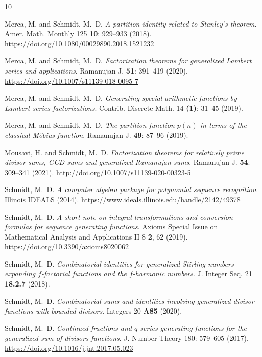 \documentclass[10pt,reqno,letterpaper]{article}
\theoremstyle{plain}
\numberwithin{theorem}{section}
\theoremstyle{definition}
\newcounter{completeBibitemIncrementCtr}
\renewenvironment{thebibliography}[1]{
     \renewcommand{\refname}{} 
     
     \begin{oldthebibliography}{#1}
     \setlength{\itemsep}{0em}
     \setlength{\parskip}{0em}
     \setlength{\topsep}{0pt}
     \setlength{\partopsep}{0pt}
     \setcounter{enumiv}{\value{completeBibitemIncrementCtr}}
     \footnotesize 
}
{
     \setcounter{completeBibitemIncrementCtr}{\value{enumiv}}
     \end{oldthebibliography}
}
\begin{document}
\begin{thebibliography}{10}

Merca, M. and Schmidt, M.~D. \emph{A partition identity related to Stanley's theorem}. 
Amer. Math. Monthly 125 {\bf 10}: 929--933 (2018). 
\url{https://doi.org/10.1080/00029890.2018.1521232}

Merca, M. and Schmidt, M.~D. \emph{Factorization theorems for generalized Lambert series and applications}. 
Ramanujan J. {\bf 51}: 391--419 (2020). 
\url{https://doi.org/10.1007/s11139-018-0095-7}

Merca, M. and Schmidt, M.~D. \emph{Generating special arithmetic functions by Lambert series factorizations}. 
Contrib. Discrete Math. 14 {\bf (1)}: 31--45 (2019). 

Merca, M. and Schmidt, M.~D. \emph{The partition function $p(n)$ in terms of the classical M\"{o}bius function}. 
Ramanujan J. {\bf 49}: 87--96 (2019). 

Mousavi, H. and Schmidt, M.~D. \emph{Factorization theorems for relatively prime divisor sums, 
                                     GCD sums and generalized Ramanujan sums}. 
Ramanujan J. {\bf 54}: 309--341 (2021). 
\url{http://doi.org/10.1007/s11139-020-00323-5} 

Schmidt, M.~D. \emph{A computer algebra package for polynomial sequence recognition}. 
Illinois IDEALS (2014). 
\url{https://www.ideals.illinois.edu/handle/2142/49378}

Schmidt, M.~D. \emph{A short note on integral transformations and 
                     conversion formulas for sequence generating functions}. 
Axioms Special Issue on Mathematical Analysis and Applications II 8 {\bf 2}, 62 (2019). 
\url{https://doi.org/10.3390/axioms8020062} 

Schmidt, M.~D. \emph{Combinatorial identities for generalized Stirling numbers 
                     expanding $f$-factorial functions and the $f$-harmonic numbers}. 
J. Integer Seq. 21 {\bf 18.2.7} (2018). 

Schmidt, M.~D. \emph{Combinatorial sums and identities involving generalized divisor functions with bounded divisors}. 
Integers 20 {\bf A85} (2020). 

Schmidt, M.~D. \emph{Continued fractions and $q$-series generating functions for the 
                     generalized sum-of-divisors functions}. 
J. Number Theory 180: 579--605 (2017). 
\url{https://doi.org/10.1016/j.jnt.2017.05.023}


\end{thebibliography}
\end{document}
